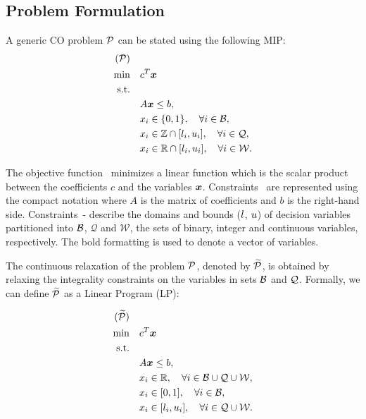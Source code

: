 \documentclass[3p, authoryear, times]{elsarticle}
\begin{document}
\subsection{Problem Formulation} \label{sec:lns:formulation}


A generic CO problem $\P$ can be stated using the following MIP: 
\begin{align}
    (\P) \quad & \nonumber \\
    \min \quad & c^T \xb \label{eq:mip:obj} \\
    \text{s.t.} \quad & \nonumber \\  
    & A\xb \leq b, \label{eq:mip:constraints} \\
    & x_i \in \{0,1\}, \quad \forall i \in \setbin, \label{eq:mip:bin}\\
    & x_i \in \mathbb{Z} \cap [\lb_i, \ub_i] , \quad \forall i \in \setint, \label{eq:mip:int} \\
    & x_i \in \mathbb{R} \cap [\lb_i, \ub_i] , \quad \forall i \in \setcontinuous. \label{eq:mip:continuous}
\end{align}


The objective function~ minimizes a linear function which is the scalar product between the coefficients $c$ and the variables $\xb$. Constraints~ are represented using the compact notation where $A$ is the matrix of coefficients and $b$ is the right-hand side. Constraints~- describe the domains and bounds ($\lb$,  $\ub$) of decision variables partitioned into  $\setbin$, $\mathcal{Q}$ and $\mathcal{W}$, the sets of binary, integer and continuous variables, respectively. The bold formatting is used to denote a vector of variables. 

The continuous relaxation of the problem $\P$, denoted by $\Plin$, is obtained by relaxing the integrality constraints on the variables in sets $\setbin$ and $\setint$. Formally, we can define $\Plin$ as a Linear Program (LP): 

\begin{align}
    (\Plin) \quad & \nonumber \\
    \min \quad & c^T \xb \label{eq:lp:obj} \\
    \text{s.t.} \quad & \nonumber \\ 
    & A\xb \leq b, \label{eq:lp:constraints} \\
    & x_i \in \mathbb{R} , \quad \forall i \in \setbin \cup \setint\cup \setcontinuous,  \label{eq:lp:real}  \\
    & x_i \in [0,1], \quad \forall i \in \setbin, \label{eq:lp:bin}  \\
    & x_i \in [\lb_i, \ub_i] , \quad \forall i \in \setint\cup \setcontinuous. \label{eq:lp:bounds}
\end{align}
\end{document}
